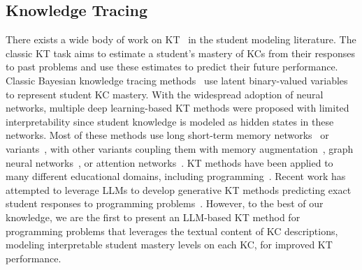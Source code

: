 \subsection{Knowledge Tracing}
There exists a wide body of work on KT~\cite{kt} in the student modeling literature. 
The classic KT task aims to estimate a student's mastery of KCs from their responses to past problems and use these estimates to predict their future performance.
Classic Bayesian knowledge tracing methods~\cite{ktcomparepardos,yudelson} use latent binary-valued variables to represent student KC mastery.
With the widespread adoption of neural networks, multiple deep learning-based KT methods were proposed with limited interpretability since student knowledge is modeled as hidden states in these networks.
Most of these methods use long short-term memory networks~\cite{lstm} or variants~\cite{dkt,saint+}, with other variants coupling them with memory augmentation~\cite{dkvmn}, graph neural networks~\cite{gikt}, or attention networks~\cite{akt,sakt}.
KT methods have been applied to many different educational domains, including programming~\cite{hoq2023sann,codedkt,pkt}. Recent work has attempted to leverage LLMs to develop generative KT methods predicting exact student responses to programming problems~\cite{tiktoc,infooirt,okt}. However, to the best of our knowledge, we are the first to present an LLM-based KT method for programming problems that leverages the textual content of KC descriptions, modeling interpretable student mastery levels on each KC, for improved KT performance.